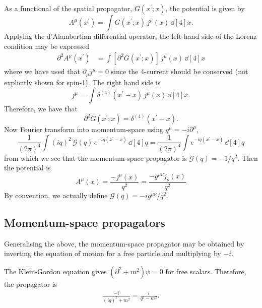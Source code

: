 \documentclass{report}
\begin{document}
As a functional of the spatial propagator, $G(x^\prime; x)$, the potential is given by
\begin{equation}
A^\mu(x^\prime) = \int G(x^\prime; x) \, j^\mu(x) \, \dd[4]{x}.
\end{equation}
Applying the d'Alambertian differential operator, the left-hand side of the Lorenz condition may be expressed
\begin{align}
\partial^2 A^\mu(x^\prime) &= \int  \left[ \partial^2 G(x^\prime; x) \right] \, j^\mu(x) \, \dd[4]{x}
\end{align}
where we have used that $\partial_\mu j^\mu = 0$ since the 4-current should be conserved (not explicitly shown for spin-1). The right hand side is
\begin{equation}
j^\mu = \int \delta^{(4)}(x^\prime - x) \, j^\mu(x) \, \dd[4]{x}.
\end{equation}
Therefore, we have that
\begin{equation}
\partial^2 G(x^\prime; x) = \delta^{(4)}(x^\prime - x).
\end{equation}
Now Fourier transform into momentum-space using $q^\mu = -i\partial^\mu$, 
\begin{equation}
\frac{1}{(2\pi)^4} \int (iq)^2 \, \mathcal{G}(q) \, e^{-iq(x^\prime - x)} \, \dd[4]{q}  = \frac{1}{(2\pi)^4} \int e^{-iq(x^\prime - x)} \, \dd[4]{q}
\end{equation}
from which we see that the momentum-space propagator is $\mathcal{G}(q) = -1/q^2$. Then the potential is
\begin{equation}
A^\mu(x) = \frac{-j^\mu(x)}{q^2} = \frac{-g^{\mu\nu} j_\nu(x)}{q^2}
\end{equation}
By convention, we actually define $\boxed{\mathcal{G}(q) = -i g^{\mu\nu}/q^2}$.

\subsection{Momentum-space propagators}
Generalising the above, the momentum-space propagator may be obtained by inverting the equation of motion for a free particle and multiplying by $-i$.

The Klein-Gordon equation gives $(\partial^2 + m^2)\psi = 0$ for free scalars. Therefore, the propagator is
\begin{align}
\frac{-i}{(iq)^2 + m^2} = \frac{i}{q^2-m^2}.
\end{align}
\end{document}
